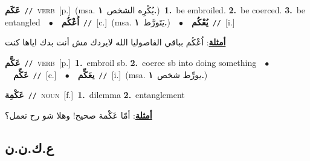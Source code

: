 \documentclass[10pt,a4paper,twoside]{article} %
\begin{document}
\begin{multicols}{2}
{\setlength\topsep{0pt}\textbf{\foreignlanguage{arabic}{عَكَم}}\ {\color{gray}\texttt{//}\color{black}}\ \textsc{verb}\ [p.]\ \color{gray}(msa. \foreignlanguage{arabic}{يُكْرِه الشخص}~\foreignlanguage{arabic}{\textbf{١.}})\color{black}\ \textbf{1.}~be embroiled.  \textbf{2.}~be coerced.  \textbf{3.}~be entangled\ \ $\bullet$\ \ \setlength\topsep{0pt}\textbf{\foreignlanguage{arabic}{اُعْكُم}}\ {\color{gray}\texttt{//}\color{black}}\ [c.]\ \color{gray}(msa. \foreignlanguage{arabic}{يَتَورَّط}~\foreignlanguage{arabic}{\textbf{١.}})\color{black}\ \ $\bullet$\ \ \setlength\topsep{0pt}\textbf{\foreignlanguage{arabic}{يُعْكُم}}\ {\color{gray}\texttt{//}\color{black}}\ [i.]\  \begin{flushright}\color{gray}\foreignlanguage{arabic}{\textbf{\underline{\foreignlanguage{arabic}{أمثلة}}}: اُعْكُم بباقي الفاصوليا الله لايردك مش أنت بدك اياها كنت}\end{flushright}\color{black}} \vspace{2mm}

{\setlength\topsep{0pt}\textbf{\foreignlanguage{arabic}{عَكَّم}}\ {\color{gray}\texttt{//}\color{black}}\ \textsc{verb}\ [p.]\ \textbf{1.}~embroil sb.  \textbf{2.}~coerce sb into doing something\ \ $\bullet$\ \ \setlength\topsep{0pt}\textbf{\foreignlanguage{arabic}{عَكِّم}}\ {\color{gray}\texttt{//}\color{black}}\ [c.]\ \ $\bullet$\ \ \setlength\topsep{0pt}\textbf{\foreignlanguage{arabic}{يعَكِّم}}\ {\color{gray}\texttt{//}\color{black}}\ [i.]\ \color{gray}(msa. \foreignlanguage{arabic}{يورِّط شخص}~\foreignlanguage{arabic}{\textbf{١.}})\color{black}\ } \vspace{2mm}

{\setlength\topsep{0pt}\textbf{\foreignlanguage{arabic}{عَكْمِة}}\ {\color{gray}\texttt{//}\color{black}}\ \textsc{noun}\ [f.]\ \textbf{1.}~dilemma  \textbf{2.}~entanglement\  \begin{flushright}\color{gray}\foreignlanguage{arabic}{\textbf{\underline{\foreignlanguage{arabic}{أمثلة}}}: أمّا عَكْمة صحيح! وهلا شو رح تعمل؟}\end{flushright}\color{black}} \vspace{2mm}

\vspace{-3mm}
\subsection*{\color{blue}\foreignlanguage{arabic}{ع.ك.ن.ن}\color{blue}{}} 


\end{multicols}
\end{document}
